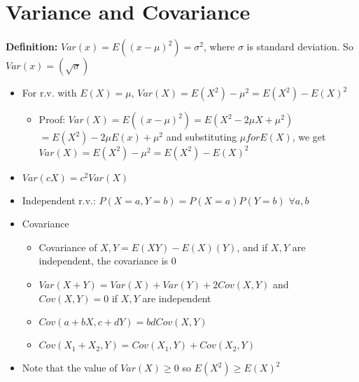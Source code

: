 \documentclass[a4paper]{article}
\begin{document}
\section{Variance and Covariance}
\textbf{Definition:} $Var(x) = E((x-\mu)^2) = \sigma^2$, where $\sigma$ is standard deviation. So $Var(x) = (\sqrt\sigma)$
\begin{itemize}
    \item For r.v. with $E(X) = \mu$, $Var(X) = E(X^2) - \mu^2 = E(X^2) - E(X)^2$
        \begin{itemize}
            \item Proof: $Var(X) = E((x-\mu)^2) = E(X^2 - 2\mu X + \mu^2)$\\ $= E(X^2) - 2\mu E(x) + \mu^2$ and substituting $\mu for E(X)$, we get \\ $Var(X) = E(X^2) - \mu^2 = E(X^2) - E(X)^2$
        \end{itemize}
    \item $Var(cX) = c^2Var(X)$
    \item Independent r.v.: $P(X=a, Y=b) = P(X=a)P(Y=b)$ $\forall a,b$
    \item Covariance
    \begin{itemize}
        \item Covariance of $X,Y = E(XY) - E(X)(Y)$, and if $X,Y$ are independent, the covariance is $0$
        \item $Var(X+Y) = Var(X) + Var(Y) + 2Cov(X,Y)$ and $Cov(X,Y) = 0$ if $X,Y$ are independent
        \item $Cov(a + bX, c + dY) = bdCov(X,Y)$
        \item $Cov(X_1 + X_2, Y) = Cov(X_1,Y) + Cov(X_2,Y)$
    \end{itemize}

    \item Note that the value of $Var(X) \geq 0$ so $E(X^2) \geq E(X)^2$

\end{itemize}
\end{document}
